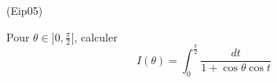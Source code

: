 \begin{tiny}(Eip05)\end{tiny}
Pour $\theta\in ]0,\frac{\pi}{2}[$, calculer
\begin{displaymath}
 I(\theta) = \int_0^\frac{\pi}{2}\frac{dt}{1+\cos \theta \cos t}
\end{displaymath}